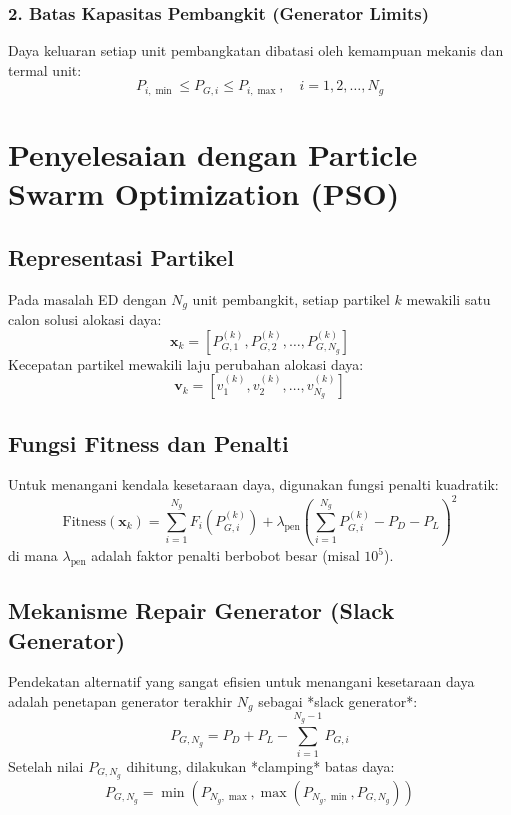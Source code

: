 \documentclass[11pt,a4paper]{article}
\begin{document}
\subsubsection{2. Batas Kapasitas Pembangkit (Generator Limits)}
Daya keluaran setiap unit pembangkatan dibatasi oleh kemampuan mekanis dan termal unit:
\begin{equation}
    P_{i,\min} \le P_{G,i} \le P_{i,\max}, \quad i = 1, 2, \dots, N_g
\end{equation}

\section{Penyelesaian dengan Particle Swarm Optimization (PSO)}

\subsection{Representasi Partikel}
Pada masalah ED dengan $N_g$ unit pembangkit, setiap partikel $k$ mewakili satu calon solusi alokasi daya:
\begin{equation}
    \mathbf{x}_k = [P_{G,1}^{(k)}, P_{G,2}^{(k)}, \dots, P_{G,N_g}^{(k)}]
\end{equation}
Kecepatan partikel mewakili laju perubahan alokasi daya:
\begin{equation}
    \mathbf{v}_k = [v_1^{(k)}, v_2^{(k)}, \dots, v_{N_g}^{(k)}]
\end{equation}

\subsection{Fungsi Fitness dan Penalti}
Untuk menangani kendala kesetaraan daya, digunakan fungsi penalti kuadratik:
\begin{equation}
    \text{Fitness}(\mathbf{x}_k) = \sum_{i=1}^{N_g} F_i(P_{G,i}^{(k)}) + \lambda_{\text{pen}} \left( \sum_{i=1}^{N_g} P_{G,i}^{(k)} - P_D - P_L \right)^2
\end{equation}
di mana $\lambda_{\text{pen}}$ adalah faktor penalti berbobot besar (misal $10^5$).

\subsection{Mekanisme Repair Generator (Slack Generator)}
Pendekatan alternatif yang sangat efisien untuk menangani kesetaraan daya adalah penetapan generator terakhir $N_g$ sebagai *slack generator*:
\begin{equation}
    P_{G,N_g} = P_D + P_L - \sum_{i=1}^{N_g-1} P_{G,i}
\end{equation}
Setelah nilai $P_{G,N_g}$ dihitung, dilakukan *clamping* batas daya:
\begin{equation}
    P_{G,N_g} = \min \left( P_{N_g,\max}, \max \left( P_{N_g,\min}, P_{G,N_g} \right) \right)
\end{equation}
\end{document}
